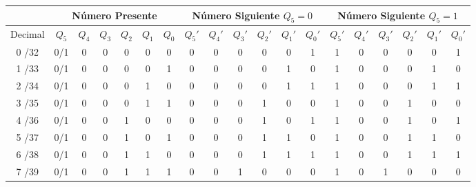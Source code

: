 \begin{table}[H]
  \centering
  \begin{adjustbox}{max width=\textwidth}
    \begin{tabular}{ c | c | c | c | c | c | c ||| c | c | c | c | c | c || c | c | c | c | c | c }
       & \multicolumn{6}{c}{\textbf{Número Presente}} &
       \multicolumn{6}{c}{\textbf{Número Siguiente} \small{$Q_5=0$}} &
       \multicolumn{6}{c}{\textbf{Número Siguiente} \small{$Q_5=1$}} \\
      \toprule
      Decimal  &
      $Q_5$ & $Q_4$ & $Q_3$ & $Q_2$ & $Q_1$ & $Q_0$ &
      $Q_5\prime$ & $Q_4\prime$ & $Q_3\prime$ & $Q_2\prime$ & $Q_1\prime$ & $Q_0\prime$ &
      $Q_5\prime$ & $Q_4\prime$ & $Q_3\prime$ & $Q_2\prime$ & $Q_1\prime$ & $Q_0\prime$ \\
      \toprule
      0 /32 & 0/1 & 0 & 0 & 0 & 0 & 0 &   0 & 0 & 0 & 0 & 0 & 1 &   1 & 0 & 0 & 0 & 0 & 1 \\
      1 /33 & 0/1 & 0 & 0 & 0 & 0 & 1 &   0 & 0 & 0 & 0 & 1 & 0 &   1 & 0 & 0 & 0 & 1 & 0 \\
      2 /34 & 0/1 & 0 & 0 & 0 & 1 & 0 &   0 & 0 & 0 & 0 & 1 & 1 &   1 & 0 & 0 & 0 & 1 & 1 \\
      3 /35 & 0/1 & 0 & 0 & 0 & 1 & 1 &   0 & 0 & 0 & 1 & 0 & 0 &   1 & 0 & 0 & 1 & 0 & 0 \\ \hline
      4 /36 & 0/1 & 0 & 0 & 1 & 0 & 0 &   0 & 0 & 0 & 1 & 0 & 1 &   1 & 0 & 0 & 1 & 0 & 1 \\
      5 /37 & 0/1 & 0 & 0 & 1 & 0 & 1 &   0 & 0 & 0 & 1 & 1 & 0 &   1 & 0 & 0 & 1 & 1 & 0 \\
      6 /38 & 0/1 & 0 & 0 & 1 & 1 & 0 &   0 & 0 & 0 & 1 & 1 & 1 &   1 & 0 & 0 & 1 & 1 & 1 \\
      7 /39 & 0/1 & 0 & 0 & 1 & 1 & 1 &   0 & 0 & 1 & 0 & 0 & 0 &   1 & 0 & 1 & 0 & 0 & 0 \\ \hline

\end{tabular}
\end{adjustbox}
\end{table}
